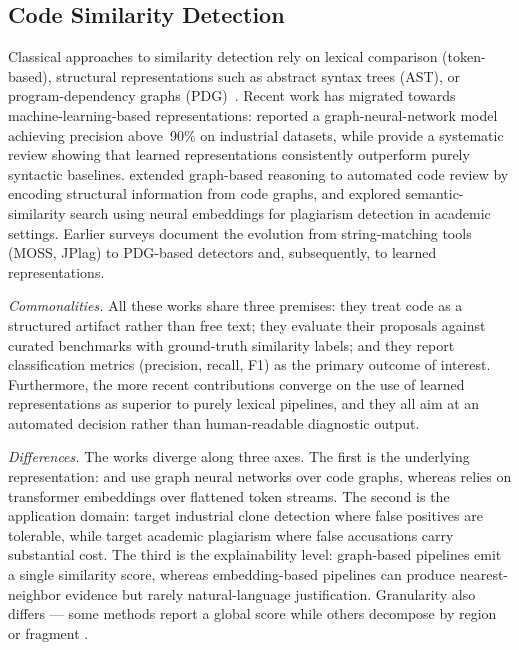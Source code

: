 \documentclass[twocolumn,11pt]{article}
\begin{document}
    \subsection{Code Similarity Detection}
    Classical approaches to similarity detection rely on lexical comparison (token-based), structural representations such as abstract syntax trees (AST), or program-dependency graphs (PDG)~\citep{lee2023review,zakeri2023systematic}. Recent work has migrated towards machine-learning-based representations: \citet{li2024code} reported a graph-neural-network model achieving precision above~90\% on industrial datasets, while \citet{zhang2025machine} provide a systematic review showing that learned representations consistently outperform purely syntactic baselines. \citet{yin2023automatic} extended graph-based reasoning to automated code review by encoding structural information from code graphs, and \citet{ebrahim2024semantic} explored semantic-similarity search using neural embeddings for plagiarism detection in academic settings. Earlier surveys \citep{franclinton2020scalable,zakeri2023systematic} document the evolution from string-matching tools (MOSS, JPlag) to PDG-based detectors and, subsequently, to learned representations.
     
    \textit{Commonalities.} All these works share three premises: they treat code as a structured artifact rather than free text; they evaluate their proposals against curated benchmarks with ground-truth similarity labels; and they report classification metrics (precision, recall, F1) as the primary outcome of interest. Furthermore, the more recent contributions \citep{li2024code,yin2023automatic,zhang2025machine,ebrahim2024semantic} converge on the use of learned representations as superior to purely lexical pipelines, and they all aim at an automated decision rather than human-readable diagnostic output.
     
    \textit{Differences.} The works diverge along three axes. The first is the underlying representation: \citet{yin2023automatic} and \citet{li2024code} use graph neural networks over code graphs, whereas \citet{ebrahim2024semantic} relies on transformer embeddings over flattened token streams. The second is the application domain: \citet{li2024code} target industrial clone detection where false positives are tolerable, while \citet{ebrahim2024semantic} target academic plagiarism where false accusations carry substantial cost. The third is the explainability level: graph-based pipelines emit a single similarity score, whereas embedding-based pipelines can produce nearest-neighbor evidence but rarely natural-language justification. Granularity also differs --- some methods report a global score \citep{li2024code,yin2023automatic} while others decompose by region or fragment \citep{ebrahim2024semantic}.
     
\end{document}
